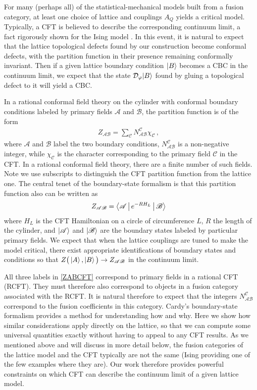 For many (perhaps all) of the statistical-mechanical models built from a fusion category, at least one choice of lattice and couplings $A_Q$ yields a critical model. Typically, a CFT is believed to describe the corresponding continuum limit, a fact rigorously shown for the Ising model \cite{Smirnov2012}.  In this event, it is natural to expect that the lattice topological defects found by our construction become conformal defects, with the partition function in their presence remaining conformally invariant. Then if a given lattice boundary condition $\ket{B}$ becomes a CBC in the continuum limit, we expect that the state ${\mathcal{D}}_\varphi|B\rangle$ found by gluing a topological defect to it will yield a CBC. 

In a rational conformal field theory on the cylinder with conformal boundary conditions labeled by primary fields $\mathscr{A}$ and $\mathscr{B}$, the partition function is of the form \cite{Cardy1989}
\begin{align}
Z_{\mathscr{AB}} = \sum_\mathscr{C} N^\mathscr{C}_{\mathscr{AB}}\chi^{}_\mathscr{C} \,,
\label{ZABCFT}
\end{align}
where $\mathscr{A}$ and $\mathscr{B}$ label the two boundary conditions, $N^\mathscr{C}_{\mathscr{AB}}$ is a non-negative integer, while $\chi_\mathscr{C}$ is the character corresponding to the primary field $\mathscr{C}$ in the CFT.  
In a rational conformal field theory, there are a finite number of such fields. Note we use subscripts to distinguish the CFT partition function from the lattice one.
The central tenet of the boundary-state formalism is that this partition function also can be written as 
\begin{align}
	Z_{\mathscr{AB}} = \Braket{\mathscr{A} | e^{-R H_L} | \mathscr{B} }
\label{ZAHB}
\end{align}
where $H_L$ is the CFT Hamiltonian on a circle of circumference $L$, $R$ the length of the cylinder, and $\ket{\mathscr{A}}$ and $\ket{\mathscr{B}}$ are the boundary states labeled by particular primary fields.
We expect that when the lattice couplings are tuned to make the model critical, there exist appropriate identifications of boundary states and conditions so that $Z\big(\ket{A},\ket{B}\big) \to Z_{\mathscr{AB}}$ in the continuum limit.

All three labels in \eqref{ZABCFT} correspond to primary fields in a rational CFT (RCFT).
They must therefore also correspond to objects in a fusion category~\cite{MooreSeiberg:89} associated with the RCFT. 
It is natural therefore to expect that the integers $N^\mathscr{C}_{\mathscr{AB}}$ correspond to the fusion coefficients in this category.
Cardy's boundary-state formalism \cite{Cardy1989} provides a method for understanding how and why. Here we show how similar considerations apply directly on the lattice, so that we can compute some universal quantities exactly without having to appeal to any CFT results. As we mentioned above and will discuss in more detail below, the fusion categories of the lattice model and the CFT typically are not the same (Ising providing one of the few examples where they are). Our work therefore provides powerful constraints on which CFT can describe the continuum limit of a given lattice model. 




